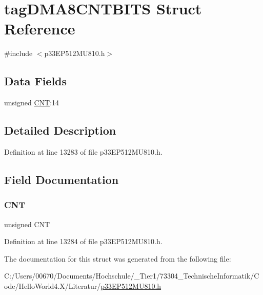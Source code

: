\hypertarget{structtag_d_m_a8_c_n_t_b_i_t_s}{}\section{tag\+D\+M\+A8\+C\+N\+T\+B\+I\+TS Struct Reference}
\label{structtag_d_m_a8_c_n_t_b_i_t_s}


{\ttfamily \#include $<$p33\+E\+P512\+M\+U810.\+h$>$}

\subsection*{Data Fields}
\begin{DoxyCompactItemize}
\item 
unsigned \hyperlink{structtag_d_m_a8_c_n_t_b_i_t_s_a30be39d82c244f19fd98dd74227487f6}{C\+NT}\+:14
\end{DoxyCompactItemize}


\subsection{Detailed Description}


Definition at line 13283 of file p33\+E\+P512\+M\+U810.\+h.



\subsection{Field Documentation}
\mbox{\label{structtag_d_m_a8_c_n_t_b_i_t_s_a30be39d82c244f19fd98dd74227487f6}} 
\subsubsection{\texorpdfstring{C\+NT}{CNT}}
{\footnotesize\ttfamily unsigned C\+NT}



Definition at line 13284 of file p33\+E\+P512\+M\+U810.\+h.



The documentation for this struct was generated from the following file\+:\begin{DoxyCompactItemize}
\item 
C\+:/\+Users/00670/\+Documents/\+Hochschule/\+\_\+\+Tier1/73304\+\_\+\+Technische\+Informatik/\+Code/\+Hello\+World4.\+X/\+Literatur/\hyperlink{p33_e_p512_m_u810_8h}{p33\+E\+P512\+M\+U810.\+h}\end{DoxyCompactItemize}

